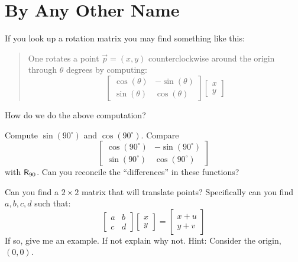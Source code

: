 \newpage
\section{By Any Other Name}

If you look up a rotation matrix you may find something like this:
\begin{quote}
One rotates a point $\vec{p} = (x,y)$ counterclockwise around the
origin through $\theta$ degrees by computing:
\[
\begin{bmatrix}
\cos(\theta) & -\sin(\theta) \\
\sin(\theta) & \cos(\theta)
\end{bmatrix}
\begin{bmatrix}
x \\
y
\end{bmatrix}
\]
\end{quote}

\begin{prob}
How do we do the above computation?
\end{prob}

\begin{prob}
Compute $\sin(90^\circ)$ and $\cos(90^\circ)$. Compare 
\[
\begin{bmatrix}
\cos(90^\circ) & -\sin(90^\circ) \\
\sin(90^\circ) & \cos(90^\circ)
\end{bmatrix}
\]
with $\mathsf{R}_{90}$. Can you reconcile the ``differences'' in these functions?
\end{prob}



\begin{prob}
Can you find a $2\times 2$ matrix that will translate points? Specifically can you find $a,b,c,d$ such that:
\[
\begin{bmatrix}
a & b \\
c & d
\end{bmatrix}
\begin{bmatrix}
x \\
y 
\end{bmatrix}
= 
\begin{bmatrix}
x + u\\
y +v
\end{bmatrix}
\]
If so, give me an example. If not explain why not. Hint: Consider the origin, $(0,0)$. 
\end{prob}


